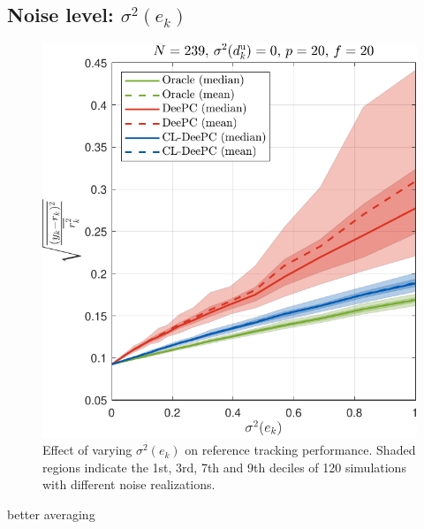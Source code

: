 \subsection{Noise level: $\sigma^2(e_k)$}
\begin{figure}[b!]
\begin{center}
\includegraphics[width=\columnwidth]{results/figures/Varying_Re_0.0001-1-50_Nbar_239_p_20_f_20_Ru_1_Rdu_0_Q_100_R_0_dR_10.pdf}    %
\caption{Effect of varying $\sigma^2(e_k)$ on reference tracking performance. Shaded regions indicate the 1st, 3rd, 7th and 9th deciles of 120 simulations with different noise realizations.}  %
\label{fig:varying_Re}                                 %
\end{center}                                 %
\end{figure}
better averaging

